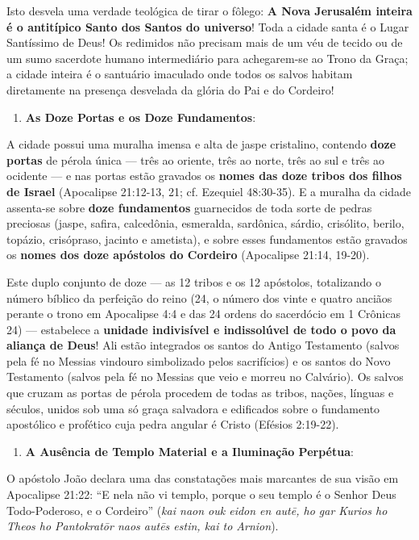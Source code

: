 \documentclass[11pt,a4paper,openany]{book}
\begin{document}
Isto desvela uma verdade teológica de tirar o fôlego: \textbf{A Nova Jerusalém inteira é o antitípico Santo dos Santos do universo}!
Toda a cidade santa é o Lugar Santíssimo de Deus! Os redimidos não precisam mais de um véu de tecido ou de um sumo sacerdote humano intermediário para achegarem-se ao Trono da Graça; a cidade inteira é o santuário imaculado onde todos os salvos habitam diretamente na presença desvelada da glória do Pai e do Cordeiro!

\begin{enumerate}
  \item \textbf{As Doze Portas e os Doze Fundamentos}:
\end{enumerate}

A cidade possui uma muralha imensa e alta de jaspe cristalino, contendo \textbf{doze portas} de pérola única — três ao oriente, três ao norte, três ao sul e três ao ocidente — e nas portas estão gravados os \textbf{nomes das doze tribos dos filhos de Israel} (Apocalipse 21:12-13, 21; cf. Ezequiel 48:30-35).
E a muralha da cidade assenta-se sobre \textbf{doze fundamentos} guarnecidos de toda sorte de pedras preciosas (jaspe, safira, calcedônia, esmeralda, sardônica, sárdio, crisólito, berilo, topázio, crisópraso, jacinto e ametista), e sobre esses fundamentos estão gravados os \textbf{nomes dos doze apóstolos do Cordeiro} (Apocalipse 21:14, 19-20).

Este duplo conjunto de doze — as 12 tribos e os 12 apóstolos, totalizando o número bíblico da perfeição do reino (24, o número dos vinte e quatro anciãos perante o trono em Apocalipse 4:4 e das 24 ordens do sacerdócio em 1 Crônicas 24) — estabelece a \textbf{unidade indivisível e indissolúvel de todo o povo da aliança de Deus}!
Ali estão integrados os santos do Antigo Testamento (salvos pela fé no Messias vindouro simbolizado pelos sacrifícios) e os santos do Novo Testamento (salvos pela fé no Messias que veio e morreu no Calvário). Os salvos que cruzam as portas de pérola procedem de todas as tribos, nações, línguas e séculos, unidos sob uma só graça salvadora e edificados sobre o fundamento apostólico e profético cuja pedra angular é Cristo (Efésios 2:19-22).

\begin{enumerate}
  \item \textbf{A Ausência de Templo Material e a Iluminação Perpétua}:
\end{enumerate}

O apóstolo João declara uma das constatações mais marcantes de sua visão em Apocalipse 21:22:
``E nela não vi templo, porque o seu templo é o Senhor Deus Todo-Poderoso, e o Cordeiro'' (\textit{kai naon ouk eidon en autē, ho gar Kurios ho Theos ho Pantokratōr naos autēs estin, kai to Arnion}).
\end{document}
